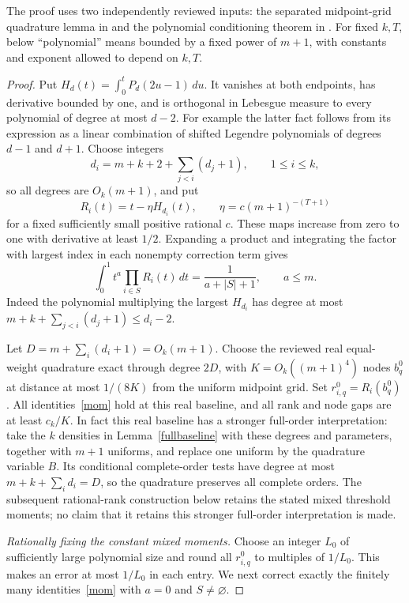 \documentclass[11pt]{article}
\begin{document}
The proof uses two independently reviewed inputs: the separated
midpoint-grid quadrature lemma in
and the polynomial conditioning theorem in
.
For fixed $k,T$, below ``polynomial'' means bounded by a fixed power
of $m+1$, with constants and exponent allowed to depend on $k,T$.

\begin{proof}
Put $H_d(t)=\int_0^t P_d(2u-1)\,du$. It vanishes at both endpoints,
has derivative bounded by one, and is orthogonal in Lebesgue measure
to every polynomial of degree at most $d-2$. For example the latter
fact follows from its expression as a linear combination of shifted
Legendre polynomials of degrees $d-1$ and $d+1$.
Choose integers
\[
 d_i=m+k+2+\sum_{j<i}(d_j+1),\qquad 1\le i\le k,
\]
so all degrees are $O_k(m+1)$, and put
\[
 R_i(t)=t-\eta H_{d_i}(t),\qquad
 \eta=c(m+1)^{-(T+1)}
\]
for a fixed sufficiently small positive rational $c$.
These maps increase from zero to one with derivative at least $1/2$.
Expanding a product and integrating the factor with largest index in
each nonempty correction term gives
\begin{equation}\label{base}
 \int_0^1 t^a\prod_{i\in S}R_i(t)\,dt
 =\frac1{a+|S|+1},\qquad a\le m.
\end{equation}
Indeed the polynomial multiplying the largest $H_{d_i}$ has degree
at most $m+k+\sum_{j<i}(d_j+1)\le d_i-2$.

Let $D=m+\sum_i(d_i+1)=O_k(m+1)$. Choose the reviewed real
equal-weight quadrature exact through degree $2D$, with
$K=O_k((m+1)^4)$ nodes $b_q^0$ at distance at most $1/(8K)$ from
the uniform midpoint grid. Set $r^0_{i,q}=R_i(b_q^0)$.
All identities~\eqref{mom} hold at this real baseline, and all rank
and node gaps are at least $c_k/K$.
In fact this real baseline has a stronger full-order interpretation:
take the $k$ densities in Lemma~\ref{fullbaseline} with these degrees
and parameters, together with $m+1$ uniforms, and replace one uniform
by the quadrature variable $B$. Its conditional complete-order tests
have degree at most $m+k+\sum_i d_i=D$, so the quadrature preserves
all complete orders. The subsequent rational-rank construction below
retains the stated mixed threshold moments; no claim that it retains
this stronger full-order interpretation is made.

\medskip\noindent\emph{Rationally fixing the constant mixed moments.}
Choose an integer $L_0$ of sufficiently large polynomial size and
round all $r^0_{i,q}$ to multiples of $1/L_0$. This makes an error
at most $1/L_0$ in each entry. We next correct exactly the finitely
many identities~\eqref{mom} with $a=0$ and $S\ne\varnothing$.


\end{proof}
\end{document}
